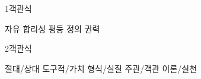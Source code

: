 \documentclass[fs95]{korfarm-base}
\begin{document}

\begin{kfWittTwoCol}

\begin{kfQBlock}{1}{객관식}
\begin{kfChoices}
\kfChoice 자유
\kfChoice 합리성
\kfChoice 평등
\kfChoice 정의
\kfChoice 권력
\end{kfChoices}
\end{kfQBlock}

\begin{kfQBlock}{2}{객관식}
\begin{kfChoices}
\kfChoice 절대/상대
\kfChoice 도구적/가치
\kfChoice 형식/실질
\kfChoice 주관/객관
\kfChoice 이론/실천
\end{kfChoices}
\end{kfQBlock}
\end{kfWittTwoCol}
\end{document}
